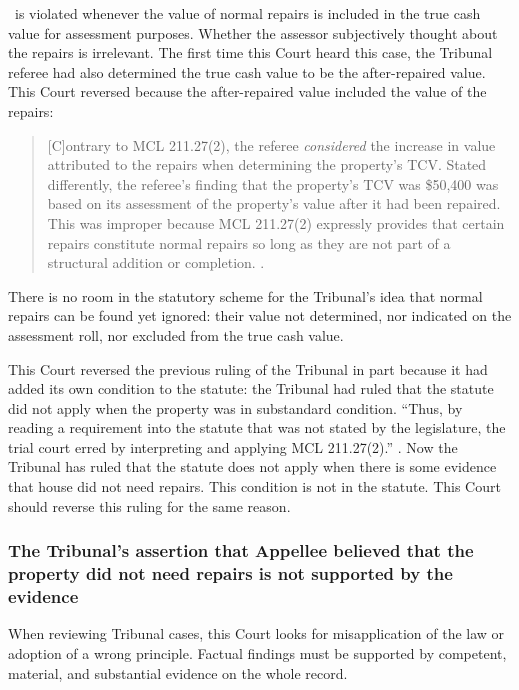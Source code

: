 \documentclass[12pt,\documentclassflag]{michiganCourtOfAppealsBrief}
\begin{document}
\mathieuGast\ is violated whenever the value of normal repairs is included in the true cash value for assessment purposes. Whether the assessor subjectively thought about the repairs is irrelevant. The first time this Court heard this case, the Tribunal referee had also determined the true cash value to be the after-repaired value. This Court reversed because the after-repaired value included the value of the repairs:

\begin{quote}
[C]ontrary to MCL 211.27(2), the referee {\em considered} the increase in value attributed to the repairs when determining the property's TCV. Stated differently, the referee's finding that the property's TCV was \$50,400 was based on its assessment of the property's value after it had been repaired. This was improper because MCL 211.27(2) expressly provides that certain repairs constitute normal repairs so long as they are not part of a structural addition or completion. .
\end{quote}

There is no room in the statutory scheme for the Tribunal's idea that normal repairs can be found yet ignored: their value not determined, nor indicated on the assessment roll, nor excluded from the true cash value.

This Court reversed the previous ruling of the Tribunal in part because it had added its own condition to the statute: the Tribunal had ruled that the statute did not apply when the property was in substandard condition. ``Thus, by reading a requirement into the statute that was not stated by the legislature, the trial court erred by interpreting and applying MCL 211.27(2).'' . Now the Tribunal has ruled that the statute does not apply when there is some evidence that house did not need repairs. This condition is not in the statute. This Court should reverse this ruling for the same reason.

\subsubsection{The Tribunal's assertion that Appellee believed that the property did not need repairs is not supported by the evidence}
When reviewing Tribunal cases, this Court looks for misapplication of the law or adoption of a wrong principle. Factual findings must be supported by competent, material, and substantial evidence on the whole record. 
\end{document}
